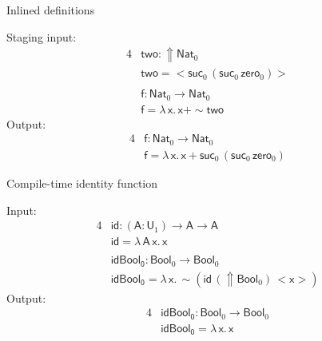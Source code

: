 \documentclass[dvipsnames,aspectratio=169]{beamer}
\newcommand{\msf}[1]{\mathsf{#1}}
\newcommand{\Lift}{{\Uparrow}}
\newcommand{\spl}{{\sim}}
\newcommand{\qut}[1]{{<}#1{>}}
\newcommand{\U}{\msf{U}}
\newcommand{\Bool}{\msf{Bool}}
\newcommand{\Nat}{\msf{Nat}}
\newcommand{\zero}{\msf{zero}}
\newcommand{\suc}{\msf{suc}}
\newcommand{\id}{\msf{id}}
\theoremstyle{remark}
\newcommand{\msA}{\msf{A}}
\newcommand{\msx}{\msf{x}}
\newcommand{\msff}{\msf{f}}
\begin{document}
\begin{frame}{Inlined definitions}

Staging input:
\begin{alignat*}{4}
  &\msf{two} : \Lift \Nat_0 \\
  &\msf{two} = \qut{\suc_0\,(\suc_0\,\zero_0)} \\
  & \\
  & \msff : \Nat_0 \to \Nat_0 \\
  & \msff = \lambda\,\msx.\, \msx + \spl{\msf{two}}
\end{alignat*}
\pause
Output:
\begin{alignat*}{4}
  & \msff : \Nat_0 \to \Nat_0 \\
  & \msff = \lambda\,\msx.\, \msx + \suc_0\,(\suc_0\,\zero_0)
\end{alignat*}


\end{frame}

\begin{frame}{Compile-time identity function}

Input:
\begin{alignat*}{4}
  & \id : (\msA : \U_1) \to \msA \to \msA\\
  & \id = \lambda\,\msA\,\msx.\,\msx     \\
  & \\
  & \msf{idBool_0} : \Bool_0 \to \Bool_0\\
  & \msf{idBool_0} = \lambda\,\msx.\,\spl(\id\,(\Lift \Bool_0)\,\qut{\msx})
\end{alignat*}
\pause
Output:
\begin{alignat*}{4}
  & \msf{idBool_0} : \Bool_0 \to \Bool_0\\
  & \msf{idBool_0} = \lambda\,\msx.\,\msx
\end{alignat*}

\end{frame}
\end{document}
